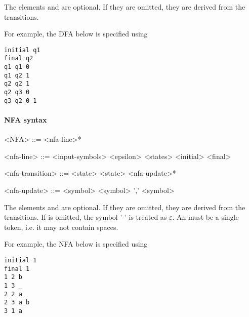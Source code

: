\documentclass[11pt]{article}
\begin{document}
The elements  and  are optional. If they are omitted, they are derived from the transitions.

For example, the DFA below is specified using

\begin{verbatim}
initial q1
final q2
q1 q1 0
q1 q2 1
q2 q2 1
q2 q3 0
q3 q2 0 1
\end{verbatim}


\paragraph{NFA syntax}
\begin{grammar}
<NFA> ::= <nfa-line>*

<nfa-line> ::= <input-symbols>
  \alt <epsilon>
  \alt <states>
  \alt <initial> 
  \alt <final> 

<nfa-transition> ::= <state> <state> <nfa-update>*

<nfa-update> ::= <symbol> <symbol> ',' <symbol>
\end{grammar}

The elements  and  are optional. If they are omitted, they are derived from the transitions. If  is omitted, the symbol '-' is treated as $\varepsilon$. An  must be a single token, i.e. it may not contain spaces.

For example, the NFA below is specified using

\begin{verbatim}
initial 1
final 1
1 2 b
1 3 _
2 2 a
2 3 a b
3 1 a
\end{verbatim}

\end{document}
